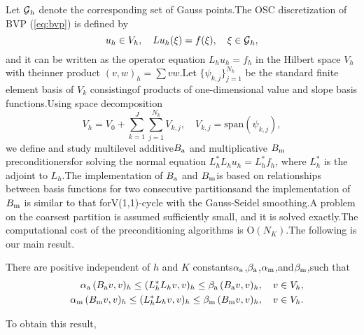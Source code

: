 \documentclass{report}
\begin{document}
Let $\mbox{${\cal G}$}_h$ denote the corresponding set of Gauss points.The OSC discretization of BVP (\ref{eq:bvp}) is defined by\begin{equation}\label{eq:osc}u_h\in V_h,\quad Lu_h(\xi)=f(\xi),\quad\xi\in\mbox{${\cal G}$}_h,\end{equation}and it can be written as the operator equation $L_hu_h=f_h$ in the Hilbert space $V_h$ with theinner product $(v,w)_h=\sum vw$.Let $\{\psi_{k,j}\}_{j=1}^{N_k}$ be the standard finite element basis of $V_k$ consistingof products of one-dimensional value and slope basis functions.Using space decomposition\[V_h=V_0+\sum_{k=1}^{J}\sum_{j=1}^{N_k}V_{k,j},
\quad V_{k,j} = \mbox{span}(\psi_{k,j}),\]we define and study multilevel additive$B_{\textup{\scriptsize a}}$ and multiplicative $B_{\textup{\scriptsize m}}$ preconditionersfor solving the normal equation $L_h^*L_hu_h=L_h^*f_h$,
where $L_h^*$ is the adjoint to $L_h$.The implementation of $B_{\textup{\scriptsize a}}$ and $B_{\textup{\scriptsize m}}$is based on relationships between basis functions for two consecutive partitionsand the implementation of $B_{\textup{\scriptsize m}}$ is similar to that forV(1,1)-cycle with the Gauss-Seidel smoothing.A problem on the coarsest partition is assumed sufficiently small,
and it is solved exactly.The computational cost of the preconditioning algorithms is $\mbox{O}(N_K)$.The following is our main result.\begin{theorem}There are positive independent of $h$ and $K$ constants$\alpha_{\textup{\scriptsize a}}$,$\beta_{\textup{\scriptsize a}}$,$\alpha_{\textup{\scriptsize m}}$,and$\beta_{\textup{\scriptsize m}}$,such that\begin{eqnarray}\label{eq:spectral_equiv}&&\alpha_{\textup{\scriptsize a}}\,
(B_{\textup{\scriptsize a}}v,v)_h\leq (L_h^*L_hv,v)_h \leq\beta_{\textup{\scriptsize a}}\,
(B_{\textup{\scriptsize a}}v,v)_h,\quad v\in V_h,\\\nonumber&&\alpha_{\textup{\scriptsize m}}\,
(B_{\textup{\scriptsize m}}v,v)_h\leq (L_h^*L_hv,v)_h \leq\beta_{\textup{\scriptsize m}}\,
(B_{\textup{\scriptsize m}}v,v)_h,\quad v\in V_h.\end{eqnarray}\end{theorem}To obtain this result,
\end{document}
